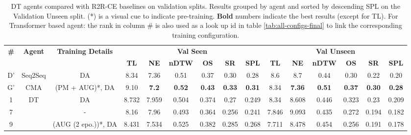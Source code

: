 \begin{table}
\centering
\caption{\label{tab:dt_final}DT agents compared with R2R-CE baselines on validation splits. Results grouped by agent and sorted by descending SPL on the Validation Unseen split. (*) is a visual
cue to indicate pre-training. \textbf{Bold} numbers indicate the best results (except for TL). For Transformer based agent:  the rank in column \# is also used as a look up id in table \ref{tab:all-configs-final} to link the corresponding training configuration.}
\begin{tabular}{@{\hskip3pt}c@{\hskip3pt}c@{\hskip3pt}c@{\hskip3pt}c@{\hskip3pt}c@{\hskip3pt}c@{\hskip3pt}c@{\hskip3pt}c@{\hskip3pt}c@{\hskip3pt}c@{\hskip3pt}c@{\hskip3pt}c@{\hskip3pt}c@{\hskip3pt}c@{\hskip3pt}c}
\toprule
\textbf{\#} & \textbf{Agent} & \textbf{Training Details} & \multicolumn{6}{c}{\textbf{Val Seen}} & \multicolumn{6}{c}{\textbf{Val Unseen}} \\
  \cmidrule(l){4-9}\cmidrule(l){10-15}\textbf{~} &     \textbf{~} &                \textbf{~} &       \textbf{TL} &     \textbf{NE} &   \textbf{nDTW} &     \textbf{OS} &     \textbf{SR} &    \textbf{SPL} &         \textbf{TL} &     \textbf{NE} &   \textbf{nDTW} &     \textbf{OS} &    \textbf{SR} &    \textbf{SPL} \\
\midrule
          D' & Seq2Seq & DA & 8.34 & 7.36 & 0.51 & 0.37 & 0.30 & 0.28 & 8.6 & 8.7 & 0.44 & 0.30 & 0.22 & 0.20 \\
          \midrule
          G' & CMA & (PM + AUG)*, DA  & 9.10 & \textbf{7.2} & \textbf{0.52} & \textbf{0.43} & \textbf{0.33} & \textbf{0.31} & 8.34 & \textbf{7.36} & \textbf{0.51} & \textbf{0.37} & \textbf{0.30} & \textbf{0.28} \\
          \midrule
          1 &             DT &                  DA &             8.732 &           7.959 &           0.504 &           0.374 &            0.27 &           0.249 &                8.34 &           8.608 &           0.446 &  0.323 &  0.23 &  0.209 \\
          7 &              &                    - &              8.16 &            7.96 &           0.493 &           0.364 &           0.256 &           0.241 &               7.846 &           9.093 &           0.435 &           0.272 &          0.194 &           0.182 \\
          9 &              &  (AUG (2 epo.))*, DA &             8.431 &  7.534 &  0.525 &  0.382 &  0.285 &  0.268 &               7.711 &  8.478 &  0.454 &           0.256 &          0.191 &           0.178 \\
\bottomrule
\end{tabular}
\end{table}
